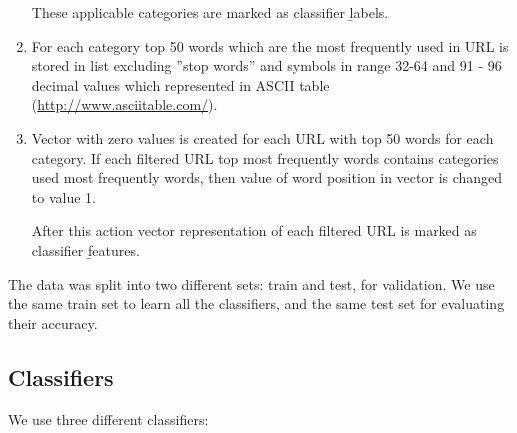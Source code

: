 \documentclass{article} %
\begin{document}
\begin{enumerate}
 	
 	These applicable categories are marked as classifier \b{labels}.
 	
 	\item For each category top 50 words which are the most frequently used in URL is stored in list excluding ''stop words'' and symbols in range 32-64 and 91 - 96 decimal values which represented in ASCII table (\href{http://www.asciitable.com/}{http://www.asciitable.com/}).
 	
 	\item Vector with zero values is created for each URL with top 50 words for each category. If each filtered URL top most frequently words contains categories used most frequently words, then value of word position in vector is changed to value 1.
 	
 	After this action vector representation of each filtered URL is marked as classifier \b{features}.
 	
 \end{enumerate} 
	
  The data was split into two different sets: train and test, for validation. We use the same train set to learn all the classifiers, and the same test set for evaluating their accuracy.


\subsection{Classifiers}

 We use three different classifiers:
\end{document}
